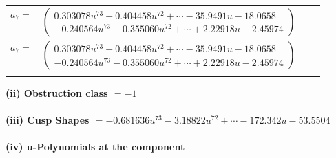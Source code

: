 \documentclass[1p]{elsarticle_modified}
\theoremstyle{definition}
\begin{document}
\begin{tabular}{m{7pt} m{180pt} m{7pt} m{180pt} }
\flushright $a_{7}=$&$\begin{pmatrix}0.303078 u^{73}+0.404458 u^{72}+\cdots-35.9491 u-18.0658\\-0.240564 u^{73}-0.355060 u^{72}+\cdots+2.22918 u-2.45974\end{pmatrix}$\\ \flushright $a_{7}=$&$\begin{pmatrix}0.303078 u^{73}+0.404458 u^{72}+\cdots-35.9491 u-18.0658\\-0.240564 u^{73}-0.355060 u^{72}+\cdots+2.22918 u-2.45974\end{pmatrix}$\\&\end{tabular}
\flushleft \textbf{(ii) Obstruction class $= -1$}\\~\\
\flushleft \textbf{(iii) Cusp Shapes $= -0.681636 u^{73}-3.18822 u^{72}+\cdots-172.342 u-53.5504$}\\~\\
\newpage\renewcommand{\arraystretch}{1}
\flushleft \textbf{(iv) u-Polynomials at the component}\newline \\
\end{document}
